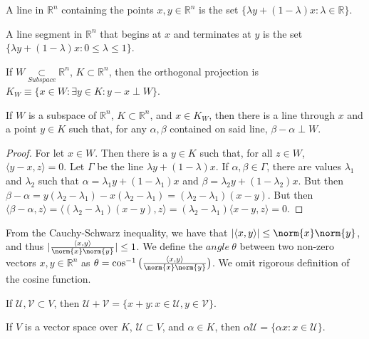 \documentclass[crop=false,class=article,oneside]{standalone}
\begin{document}
        \begin{definition}
        A line in $\mathbb{R}^n$ containing the points $x,y\in \mathbb{R}^n$ is the set $\{\lambda y + (1-\lambda)x: \lambda \in \mathbb{R}\}$.
        \end{definition}
        \begin{definition}
        A line segment in $\mathbb{R}^n$ that begins at $x$ and terminates at $y$ is the set $\{\lambda y + (1-\lambda)x: 0\leq \lambda \leq 1 \}$.
        \end{definition}
        \begin{definition}
        If $W\underset{Subspace}\subset\mathbb{R}^n$, $K \subset \mathbb{R}^n$, then the orthogonal projection is $K_{W}\equiv\{x\in W: \exists y\in K: y-x \perp W\}$.
        \end{definition}
        \begin{theorem}
        If $W$ is a subspace of $\mathbb{R}^n$, $K \subset \mathbb{R}^n$, and $x\in K_{W}$, then there is a line through $x$ and a point $y\in K$ such that, for any $\alpha, \beta$ contained on said line, $\beta-\alpha \perp W$.
        \end{theorem}
        \begin{proof}
        For let $x\in W$. Then there is a $y\in K$ such that, for all $z\in W$, $\langle y-x,z\rangle = 0$. Let $\Gamma$ be the line $\lambda y + (1-\lambda)x$. If $\alpha,\beta \in \Gamma$, there are values $\lambda_1$ and $\lambda_2$ such that $\alpha = \lambda_1 y+ (1-\lambda_1)x$ and $\beta = \lambda_2 y +(1-\lambda_2)x$. But then $\beta-\alpha = y(\lambda_2-\lambda_1)-x(\lambda_2-\lambda_1) = (\lambda_2-\lambda_1)(x-y)$. But then $\langle \beta - \alpha,z\rangle = \langle (\lambda_2-\lambda_1)(x-y),z\rangle = (\lambda_2-\lambda_1)\langle x-y,z \rangle = 0$.
        \end{proof}
        \begin{remark}
        From the Cauchy-Schwarz inequality, we have that $|\langle x,y \rangle| \leq \norm{x}\norm{y}$, and thus $|\frac{\langle x,y \rangle}{\norm{x}\norm{y}}| \leq 1$. We define the $angle\ \theta$ between two non-zero vectors $x,y\in \mathbb{R}^n$ as $\theta=\cos^{-1}\big(\frac{\langle x,y \rangle}{\norm{x}\norm{y}}\big)$. We omit rigorous definition of the cosine function.
        \end{remark}
        \begin{definition}
        If $\mathcal{U},\mathcal{V}\subset V$, then $\mathcal{U}+\mathcal{V} = \{x+y:x\in \mathcal{U},y\in \mathcal{V}\}$.
        \end{definition}
        \begin{definition}
        If $V$ is a vector space over $K$, $\mathcal{U}\subset V$, and $\alpha \in K$, then $\alpha \mathcal{U} = \{\alpha x:x\in \mathcal{U}\}$.
        \end{definition}
\end{document}
